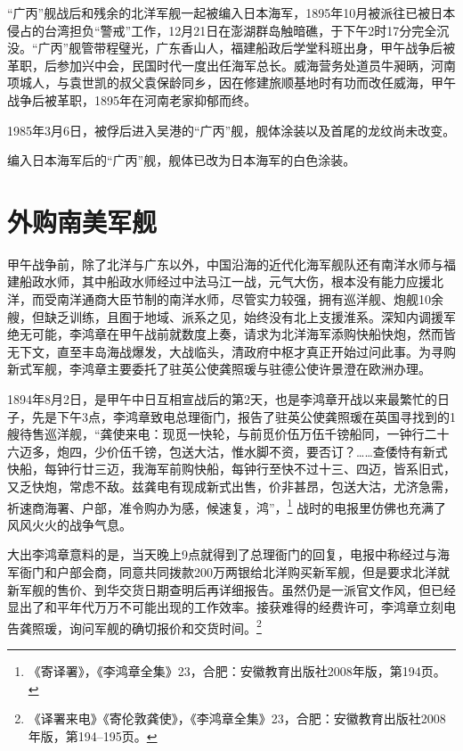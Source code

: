 \documentclass[12pt,UTF8]{ctexbook}
\begin{document}
“广丙”舰战后和残余的北洋军舰一起被编入日本海军，1895年10月被派往已被日本侵占的台湾担负“警戒”工作，12月21日在澎湖群岛触暗礁，于下午2时17分完全沉没。“广丙”舰管带程璧光，广东香山人，福建船政后学堂科班出身，甲午战争后被革职，后参加兴中会，民国时代一度出任海军总长。威海营务处道员牛昶昞，河南项城人，与袁世凯的叔父袁保龄同乡，因在修建旅顺基地时有功而改任威海，甲午战争后被革职，1895年在河南老家抑郁而终。

1985年3月6日，被俘后进入吴港的“广丙”舰，舰体涂装以及首尾的龙纹尚未改变。

编入日本海军后的“广丙”舰，舰体已改为日本海军的白色涂装。

\section{外购南美军舰}

甲午战争前，除了北洋与广东以外，中国沿海的近代化海军舰队还有南洋水师与福建船政水师，其中船政水师经过中法马江一战，元气大伤，根本没有能力应援北洋，而受南洋通商大臣节制的南洋水师，尽管实力较强，拥有巡洋舰、炮舰10余艘，但缺乏训练，且囿于地域、派系之见，始终没有北上支援淮系。深知内调援军绝无可能，李鸿章在甲午战前就数度上奏，请求为北洋海军添购快船快炮，然而皆无下文，直至丰岛海战爆发，大战临头，清政府中枢才真正开始过问此事。为寻购新式军舰，李鸿章主要委托了驻英公使龚照瑗与驻德公使许景澄在欧洲办理。

1894年8月2日，是甲午中日互相宣战后的第2天，也是李鸿章开战以来最繁忙的日子，先是下午3点，李鸿章致电总理衙门，报告了驻英公使龚照瑗在英国寻找到的1艘待售巡洋舰，“龚使来电：现觅一快轮，与前觅价伍万伍千镑船同，一钟行二十六迈多，炮四，少价伍千镑，包送大沽，惟水脚不资，要否订？……查倭恃有新式快船，每钟行廿三迈，我海军前购快船，每钟行至快不过十三、四迈，皆系旧式，又乏快炮，常虑不敌。兹龚电有现成新式出售，价非甚昂，包送大沽，尤济急需，祈速商海署、户部，准令购办为感，候速复，鸿”，\footnote{《寄译署》，《李鸿章全集》23，合肥：安徽教育出版社2008年版，第194页。} 战时的电报里仿佛也充满了风风火火的战争气息。

大出李鸿章意料的是，当天晚上9点就得到了总理衙门的回复，电报中称经过与海军衙门和户部会商，同意共同拨款200万两银给北洋购买新军舰，但是要求北洋就新军舰的售价、到华交货日期查明后再详细报告。虽然仍是一派官文作风，但已经显出了和平年代万万不可能出现的工作效率。接获难得的经费许可，李鸿章立刻电告龚照瑗，询问军舰的确切报价和交货时间。\footnote{《译署来电》《寄伦敦龚使》，《李鸿章全集》23，合肥：安徽教育出版社2008年版，第194--195页。}
\end{document}
